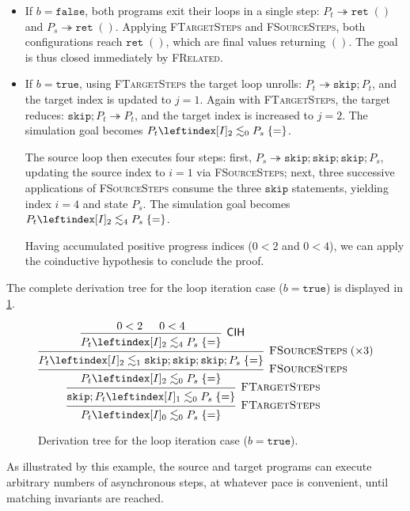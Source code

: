 \documentclass[report.tex]{subfiles}
\begin{document}
\begin{itemize}
  \item If $b = \mathtt{false}$,
        both programs exit their loops in a single step:
        $P_t \twoheadrightarrow \mathtt{ret}\; ()$
        and $P_s \twoheadrightarrow \mathtt{ret}\; ()$.
        Applying \textsc{FTargetSteps} and \textsc{FSourceSteps},
        both configurations reach $\mathtt{ret}\; ()$,
        which are final values returning $()$.
        The goal is thus closed immediately by \textsc{FRelated}.

  \item If $b = \mathtt{true}$,
        using \textsc{FTargetSteps} the target loop unrolls:
        $P_t \twoheadrightarrow \mathtt{skip} ; P_t$,
        and the target index is updated to $j = 1$.
        Again with \textsc{FTargetSteps},
        the target reduces:
        $\mathtt{skip} ; P_t \twoheadrightarrow P_t$,
        and the target index is increased to $j = 2$.
        The simulation goal becomes $\fsim{P_t}{2}{0}{P_s}{=}$.

        The source loop then executes four steps:
        first,
        $P_s \twoheadrightarrow \mathtt{skip} ; \mathtt{skip} ; \mathtt{skip} ; P_s$,
        updating the source index to $i = 1$
        via \textsc{FSourceSteps};
        next,
        three successive applications of \textsc{FSourceSteps}
        consume the three $\mathtt{skip}$ statements,
        yielding index $i = 4$
        and state $P_s$.
        The simulation goal becomes $\fsim{P_t}{2}{4}{P_s}{=}$.

        Having accumulated positive progress indices ($0 < 2$ and $0 < 4$),
        we can apply the coinductive hypothesis to conclude the proof.
\end{itemize}

The complete derivation tree for the loop iteration case ($b = \mathtt{true}$)
is displayed in \cref{fig:free-sim-example-derivation}.

\begin{figure}[htb]
  \centering
  \begin{equation*}
  \begin{prooftree}
    \hypo{0 < 2}
    \hypo{0 < 4}
    \infer2[\textsf{CIH}]{\fsim{P_t}{2}{4}{P_s}{=}}
    \infer1[\textsc{FSourceSteps}\;($\times 3$)]{%
      \fsim{P_t}{2}{1}{\mathtt{skip};\mathtt{skip};\mathtt{skip};P_s}{=}}
    \infer1[\textsc{FSourceSteps}]{\fsim{P_t}{2}{0}{P_s}{=}}
    \infer1[\textsc{FTargetSteps}]{\fsim{\mathtt{skip};P_t}{1}{0}{P_s}{=}}
    \infer1[\textsc{FTargetSteps}]{\fsim{P_t}{0}{0}{P_s}{=}}
  \end{prooftree}
\end{equation*}
\caption{Derivation tree for the loop iteration case ($b = \mathtt{true}$).}
  \label{fig:free-sim-example-derivation}
\end{figure}

As illustrated by this example,
the source and target programs can execute
arbitrary numbers of asynchronous steps,
at whatever pace is convenient,
until matching invariants are reached.
\end{document}
